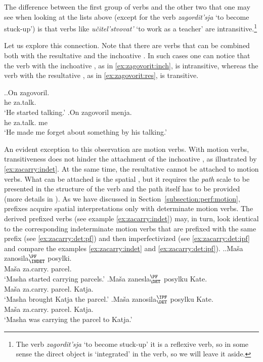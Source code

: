 The difference between the first group of verbs and the other two that one may see when looking at the lists above (except for the verb \textit{zagordit'sja} `to become stuck-up') is that verbs like \textit{u\v{c}itel'stvovat'} `to work as a teacher' are intransitive.\footnote{The verb \textit{zagordit'sja} `to become stuck-up' it is a reflexive verb, so in some sense the direct object is `integrated' in the verb, so we will leave it aside.}

Let us explore this connection. Note that there are verbs that can be combined both with the resultative and the inchoative . In such cases one can notice that the verb with the inchoative , as in \ref{ex:zagovorit:inch}, is intransitive, whereas the verb with the resultative , as in \ref{ex:zagovorit:res}, is transitive.

\ex.\ag.\label{ex:zagovorit:inch}On zagovoril.\\
he za.talk.\\
\trans `He started talking.'
\bg.\label{ex:zagovorit:res}On zagovoril menja.\\
he za.talk. me\\
\trans `He made me forget about something by his talking.'
 
An evident exception to this observation are motion verbs. With motion verbs, transitiveness does not hinder the attachment of the inchoative , as illustrated by \ref{ex:zacarry:indet}. At the same time, the resultative  cannot be attached to motion verbs. What can be attached is the spatial , but it requires the \textit{path} scale to be presented in the structure of the verb and the path itself has to be provided (more details in \citealt{ZinovaOsswald:paper}). As we have discussed in Section~\ref{subsection:perf:motion}, prefixes acquire spatial interpretations only with determinate motion verbs. The derived prefixed verbs (see example \ref{ex:zacarry:indet}) may, in turn, look identical to the corresponding indeterminate motion verbs that are prefixed with the same prefix (see \ref{ex:zacarry:det:pf}) and then imperfectivized (see \ref{ex:zacarry:det:ipf} and compare the examples \ref{ex:zacarry:indet} and \ref{ex:zacarry:det:ipf}).
 \ex.\label{ex:zacarry}\ag.\label{ex:zacarry:indet}Ma\v{s}a zanosila$^{\PF}_{\text{\INDET}}$ posylki.\\
 Ma\v{s}a za.carry. parcel.\\
 \trans `Masha started carrying parcels.'
\bg.\label{ex:zacarry:det:pf}Ma\v{s}a zanesla$^{\PF}_{\text{\DET}}$ posylku Kate.\\
 Ma\v{s}a za.carry. parcel. Katja.\\
 \trans `Masha brought Katja the parcel.'
\bg.\label{ex:zacarry:det:ipf}Ma\v{s}a zanosila$^{\IPF}_{\text{\DET}}$ posylku Kate.\\
 Ma\v{s}a za.carry. parcel. Katja.\\
 \trans `Masha was carrying the parcel to Katja.'
 
